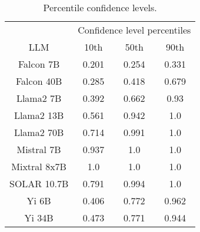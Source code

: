 \begin{table*}
\centering
\begin{tabular}{c|c|c|c}
& \multicolumn{3}{c}{Confidence level percentiles} \\ 
LLM & 10th & 50th & 90th\\ \hline
Falcon 7B & 0.201 & 0.254 & 0.331\\
Falcon 40B & 0.285 & 0.418 & 0.679\\
Llama2 7B & 0.392 & 0.662 & 0.93\\
Llama2 13B & 0.561 & 0.942 & 1.0\\
Llama2 70B & 0.714 & 0.991 & 1.0\\
Mistral 7B & 0.937 & 1.0 & 1.0\\
Mixtral 8x7B & 1.0 & 1.0 & 1.0\\
SOLAR 10.7B & 0.791 & 0.994 & 1.0\\
Yi 6B & 0.406 & 0.772 & 0.962\\
Yi 34B & 0.473 & 0.771 & 0.944\\
\hline
\end{tabular}
\caption{Percentile confidence levels.}
\label{tab:percentile_conf}
\end{table*}
